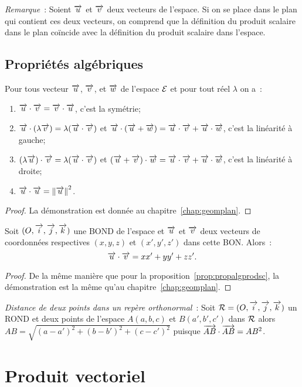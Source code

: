 \emph{Remarque}~: Soient \(\overrightarrow{u}\) et \(\overrightarrow{v}\) deux vecteurs de l'espace. Si on se place dans le plan qui contient ces deux vecteurs, on comprend que la définition du produit scalaire dans le plan coïncide avec la définition du produit scalaire dans l'espace.

\subsection{Propriétés algébriques}
\begin{prop}
  \label{prop:propalgprodsc}
  Pour tous vecteur \(\overrightarrow{u}\), \(\overrightarrow{v}\), et \(\overrightarrow{w}\) de l'espace \(\mathcal{E}\) et pour tout réel \(\lambda\) on a~:
  \begin{enumerate}
  \item \(\overrightarrow{u}\cdot\overrightarrow{v}=\overrightarrow{v}\cdot\overrightarrow{u}\), c'est la symétrie;
  \item \(\overrightarrow{u}\cdot(\lambda\overrightarrow{v})=\lambda(\overrightarrow{u}\cdot\overrightarrow{v})\) et \(\overrightarrow{u}\cdot(\overrightarrow{u}+\overrightarrow{w})=\overrightarrow{u}\cdot\overrightarrow{v}+\overrightarrow{u}\cdot\overrightarrow{w}\), c'est la linéarité à gauche;
    \item \((\lambda\overrightarrow{u})\cdot\overrightarrow{v}=\lambda(\overrightarrow{u}\cdot\overrightarrow{v})\) et \((\overrightarrow{u}+\overrightarrow{v})\cdot\overrightarrow{w}=\overrightarrow{u}\cdot\overrightarrow{v}+\overrightarrow{u}\cdot\overrightarrow{w}\), c'est la linéarité à droite;
    \item \(\overrightarrow{u}\cdot\overrightarrow{u}=\left\lVert\overrightarrow{u}\right\rVert^2\).
  \end{enumerate}
\end{prop}
\begin{proof}
  La démonstration est donnée au chapitre~\ref{chap:geomplan}.
\end{proof}
\begin{prop}
  Soit \((O,\overrightarrow{i},\overrightarrow{j},\overrightarrow{k})\) une BOND de l'espace et \(\overrightarrow{u}\) et \(\overrightarrow{v}\) deux vecteurs de coordonnées respectives \((x,y,z)\) et \((x',y',z')\) dans cette BON\@. Alors~:
  \begin{equation}
    \overrightarrow{u}\cdot\overrightarrow{v}=xx'+yy'+zz'.
  \end{equation}
\end{prop}
\begin{proof}
  De la même manière que pour la proposition~\ref{prop:propalgprodsc}, la démonstration est la même qu'au chapitre~\ref{chap:geomplan}.
\end{proof}

\emph{Distance de deux points dans un repère orthonormal}~: Soit \(\mathcal{R}=(O,\overrightarrow{i},\overrightarrow{j},\overrightarrow{k})\) un ROND et deux points de l'espace \(A(a,b,c)\) et \(B(a',b',c')\) dans \(\mathcal{R}\) alors \(AB=\sqrt{(a-a')^2+(b-b')^2+(c-c')^2}\) puisque \(\overrightarrow{AB}\cdot\overrightarrow{AB}=AB^2\).

\section{Produit vectoriel}
\label{sec:prodvec}
